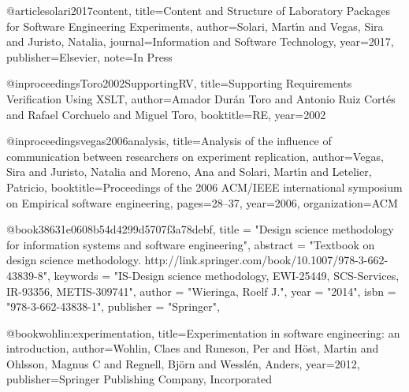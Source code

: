 @article{solari2017content,
  title={Content and Structure of Laboratory Packages for Software Engineering Experiments},
  author={Solari, Mart{\'\i}n and Vegas, Sira and Juristo, Natalia},
  journal={Information and Software Technology},
  year={2017},
  publisher={Elsevier},
	note={In Press}
}

@inproceedings{Toro2002SupportingRV,
  title={Supporting Requirements Verification Using XSLT},
  author={Amador Dur{\'a}n Toro and Antonio Ruiz Cort{\'e}s and Rafael Corchuelo and Miguel Toro},
  booktitle={RE},
  year={2002}
}

@inproceedings{vegas2006analysis,
  title={Analysis of the influence of communication between researchers on experiment replication},
  author={Vegas, Sira and Juristo, Natalia and Moreno, Ana and Solari, Mart{\'\i}n and Letelier, Patricio},
  booktitle={Proceedings of the 2006 ACM/IEEE international symposium on Empirical software engineering},
  pages={28--37},
  year={2006},
  organization={ACM}
}

@book{38631e0608b54d4299d5707f3a78debf,
title = "Design science methodology for information systems and software engineering",
abstract = "Textbook on design science methodology. http://link.springer.com/book/10.1007/978-3-662-43839-8",
keywords = "IS-Design science methodology, EWI-25449, SCS-Services, IR-93356, METIS-309741",
author = "Wieringa, {Roelf J.}",
year = "2014",
isbn = "978-3-662-43838-1",
publisher = "Springer",
}

@book{wohlin:experimentation,
  title={Experimentation in software engineering: an introduction},
  author={Wohlin, Claes and Runeson, Per and Höst, Martin and Ohlsson, Magnus C and Regnell, Björn and Wesslén, Anders},
  year={2012},
  publisher={Springer Publishing Company, Incorporated}
}

